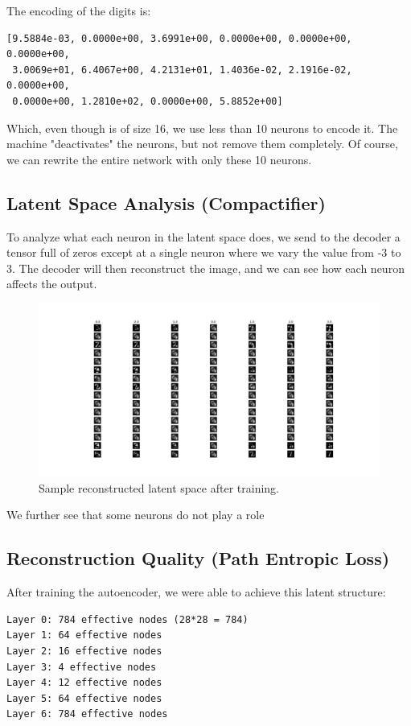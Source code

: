\documentclass[12pt]{article}
\begin{document}
The encoding of the digits is:
\begin{verbatim}
[9.5884e-03, 0.0000e+00, 3.6991e+00, 0.0000e+00, 0.0000e+00, 0.0000e+00,
 3.0069e+01, 6.4067e+00, 4.2131e+01, 1.4036e-02, 2.1916e-02, 0.0000e+00,
 0.0000e+00, 1.2810e+02, 0.0000e+00, 5.8852e+00]
\end{verbatim}

Which, even though is of size 16, we use less than 10 neurons to encode it. The machine "deactivates" the neurons, but not remove them completely. Of course, we can rewrite the entire network with only these 10 neurons.

\subsection{Latent Space Analysis (Compactifier)}
To analyze what each neuron in the latent space does, we send to the decoder a tensor full of zeros except at a single neuron where we vary the value from -3 to 3. The decoder will then reconstruct the image, and we can see how each neuron affects the output.

\begin{figure}[h!]
    \centering
    \includegraphics[width=1\textwidth]{latent_analyse.png}
    \caption{Sample reconstructed latent space after training.}
\end{figure}

We further see that some neurons do not play a role

\subsection{Reconstruction Quality (Path Entropic Loss)}

After training the autoencoder, we were able to achieve this latent structure:

\begin{verbatim}
Layer 0: 784 effective nodes (28*28 = 784)
Layer 1: 64 effective nodes
Layer 2: 16 effective nodes
Layer 3: 4 effective nodes
Layer 4: 12 effective nodes
Layer 5: 64 effective nodes
Layer 6: 784 effective nodes
\end{verbatim}
\end{document}
